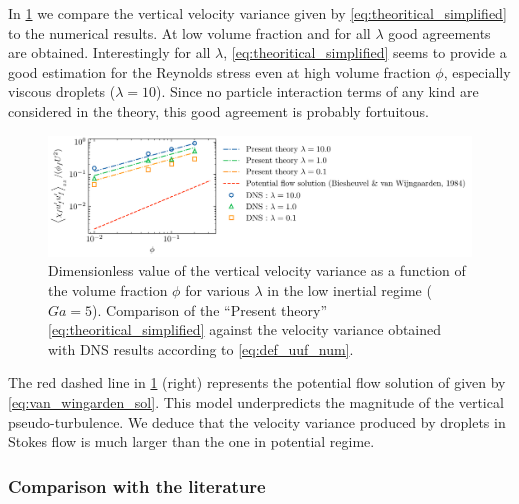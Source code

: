 In \ref{fig:uuyy} we compare the vertical velocity variance given by \ref{eq:theoritical_simplified} to the numerical results.
At low volume fraction and for all $\lambda$ good agreements are obtained. 
Interestingly for all $\lambda$, \ref{eq:theoritical_simplified} seems to provide a good estimation for the Reynolds stress even at high volume fraction $\phi$, especially viscous droplets ($\lambda = 10$). 
Since no particle interaction terms of any kind are considered in the theory, this good agreement is probably fortuitous.
\begin{figure}
    \centering
    \includegraphics[height = 0.25\textwidth]{image/HOMOGENEOUS_final/CA/UUyy_Ga_5.pdf}
    \caption{Dimensionless value of the vertical velocity variance  as a function of the volume fraction $\phi$ for various $\lambda$ in the low inertial regime ($Ga = 5$). 
    Comparison of the ``Present theory'' \eqref{eq:theoritical_simplified} against the velocity variance obtained with DNS results according to \eqref{eq:def_uuf_num}. 
    }
    \label{fig:uuyy}
\end{figure}
The red dashed line in \ref{fig:uuyy} (right) represents the potential flow solution of \citet{biesheuvel1984two} given by \ref{eq:van_wingarden_sol}. 
This model underpredicts the magnitude of the vertical pseudo-turbulence.
We deduce that the velocity variance produced by droplets in Stokes flow is much larger than the one in potential regime. 


\subsubsection{Comparison with the literature}

